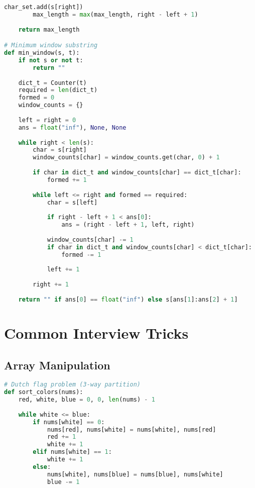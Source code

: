 \documentclass[9pt,a4paper]{article}
\begin{document}
\begin{multicols}{2}
\begin{lstlisting}[language=Python]
        char_set.add(s[right])
        max_length = max(max_length, right - left + 1)
    
    return max_length

# Minimum window substring
def min_window(s, t):
    if not s or not t:
        return ""
    
    dict_t = Counter(t)
    required = len(dict_t)
    formed = 0
    window_counts = {}
    
    left = right = 0
    ans = float("inf"), None, None
    
    while right < len(s):
        char = s[right]
        window_counts[char] = window_counts.get(char, 0) + 1
        
        if char in dict_t and window_counts[char] == dict_t[char]:
            formed += 1
        
        while left <= right and formed == required:
            char = s[left]
            
            if right - left + 1 < ans[0]:
                ans = (right - left + 1, left, right)
            
            window_counts[char] -= 1
            if char in dict_t and window_counts[char] < dict_t[char]:
                formed -= 1
            
            left += 1
        
        right += 1
    
    return "" if ans[0] == float("inf") else s[ans[1]:ans[2] + 1]
\end{lstlisting}

\section*{Common Interview Tricks}

\subsection*{Array Manipulation}
\begin{lstlisting}[language=Python]
# Dutch flag problem (3-way partition)
def sort_colors(nums):
    red, white, blue = 0, 0, len(nums) - 1
    
    while white <= blue:
        if nums[white] == 0:
            nums[red], nums[white] = nums[white], nums[red]
            red += 1
            white += 1
        elif nums[white] == 1:
            white += 1
        else:
            nums[white], nums[blue] = nums[blue], nums[white]
            blue -= 1


\end{lstlisting}
\end{multicols}
\end{document}
